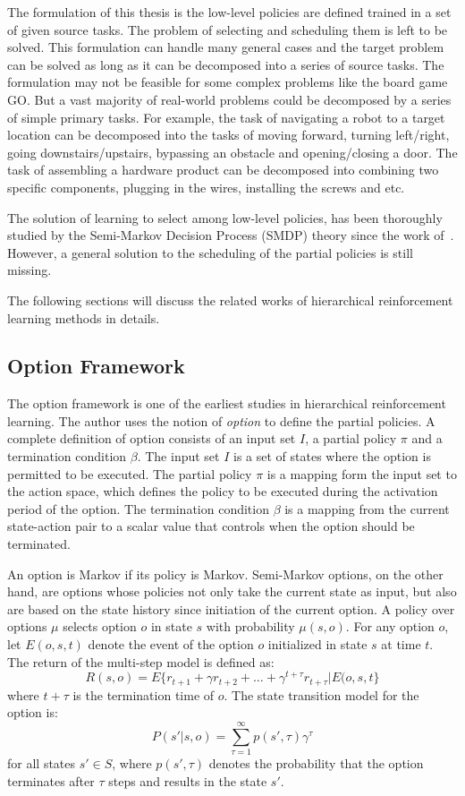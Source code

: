 The formulation of this thesis is the low-level policies are defined trained in a set of given source tasks. The problem of selecting and scheduling them is left to be solved. This formulation can handle many general cases and the target problem can be solved as long as it can be decomposed into a series of source tasks. The formulation may not be feasible for some complex problems like the board game GO. But a vast majority of real-world problems could be decomposed by a series of simple primary tasks. For example, the task of navigating a robot to a target location can be decomposed into the tasks of moving forward, turning left/right, going downstairs/upstairs, bypassing an obstacle and opening/closing a door. The task of assembling a hardware product can be decomposed into combining two specific components, plugging in the wires, installing the screws and etc.

The solution of learning to select among low-level policies, has been thoroughly studied by the Semi-Markov Decision Process (SMDP) theory since the work of~\cite{sutton1999between}. However, a general solution to the scheduling of the partial policies is still missing.

The following sections will discuss the related works of hierarchical reinforcement learning methods in details.

\subsection{Option Framework}
The option framework \cite{sutton1999between} is one of the earliest studies in hierarchical reinforcement learning. The author uses the notion of \textit{option} to define the partial policies. A complete definition of option consists of an input set $I$, a partial policy $\pi$ and a termination condition $\beta$. The input set $I$ is a set of states where the option is permitted to be executed. The partial policy $\pi$ is a mapping form the input set to the action space, which defines the policy to be executed during the activation period of the option. The termination condition $\beta$ is a mapping from the current state-action pair to a scalar value that controls when the option should be terminated.

An option is Markov if its policy is Markov. Semi-Markov options, on the other hand, are options whose policies not only take the current state as input, but also are based on the state history since initiation of the current option. A policy over options \(\mu \) selects option \(o\) in state \(s\) with probability \(\mu(s,o)\). 
For any option \(o\), let \(E(o,s,t)\) denote the event of the option $o$ initialized in state $s$ at time $t$. The return of the multi-step model is defined as:
\[ R(s,o)=E\{r_{t+1}+\gamma r_{t+2}+\ldots+\gamma^{t+\tau} r_{t+\tau} \lvert E(o,s,t\} \]
where $t+\tau$ is the termination time of $o$. The state transition model for the option is:
\[P(s' \lvert s,o)=\sum_{\tau=1}^{\infty} p(s',\tau) \gamma^\tau \]
for all states \(s' \in S \), where \( p(s',\tau) \) denotes the probability that the option terminates after \(\tau\) steps and results in the state \(s'\).

